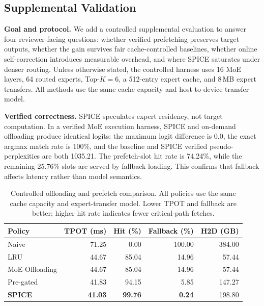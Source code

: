 %

\subsection{Supplemental Validation}
\label{sec:supplemental_validation}

\textbf{Goal and protocol.}
We add a controlled supplemental evaluation to answer four reviewer-facing
questions: whether verified prefetching preserves target outputs, whether the
gain survives fair cache-controlled baselines, whether online self-correction
introduces measurable overhead, and where SPICE saturates under denser routing.
Unless otherwise stated, the controlled harness uses 16 MoE layers, 64 routed
experts, Top-$K{=}6$, a 512-entry expert cache, and 8\,MB expert transfers. All
methods use the same cache capacity and host-to-device transfer model.

\textbf{Verified correctness.}
SPICE speculates expert residency, not target computation. In a verified MoE
execution harness, SPICE and on-demand offloading produce identical logits:
the maximum logit difference is 0.0, the exact argmax match rate is 100\%, and
the baseline and SPICE verified pseudo-perplexities are both 1035.21. The
prefetch-slot hit rate is 74.24\%, while the remaining 25.76\% slots are served
by fallback loading. This confirms that fallback affects latency rather than
model semantics.

\begin{table}[t]
\centering
\caption{Controlled offloading and prefetch comparison. All policies use the
same cache capacity and expert-transfer model. Lower TPOT and fallback are
better; higher hit rate indicates fewer critical-path fetches.}
\label{tab:supp_prefetch}
\scriptsize
\begin{tabular}{lrrrr}
\toprule
Policy & TPOT (ms) & Hit (\%) & Fallback (\%) & H2D (GB) \\
\midrule
Naive & 71.25 & 0.00 & 100.00 & 384.00 \\
LRU & 44.67 & 85.04 & 14.96 & 57.44 \\
MoE-Offloading & 44.67 & 85.04 & 14.96 & 57.44 \\
Pre-gated & 41.83 & 94.15 & 5.85 & 147.27 \\
\textbf{SPICE} & \textbf{41.03} & \textbf{99.76} & \textbf{0.24} & 198.80 \\
\bottomrule
\end{tabular}
\end{table}

